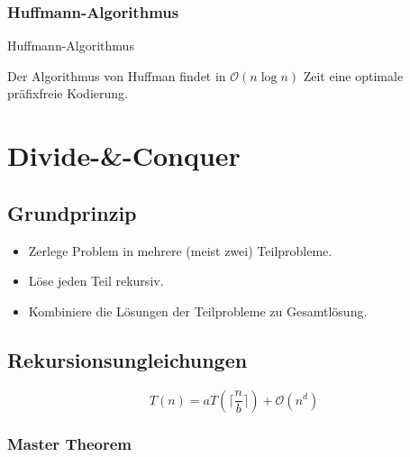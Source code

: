 \documentclass{scrartcl}
\begin{document}
\subsubsection{Huffmann-Algorithmus}

\begin{algorithm}[H]
	\caption{Huffmann-Algorithmus}
\end{algorithm}

Der Algorithmus von Huffman findet in $ \mathcal{O}(n \log n) $ Zeit eine optimale präfixfreie Kodierung.

\section{Divide-\&-Conquer}

\subsection{Grundprinzip}

\begin{itemize}
	\item Zerlege Problem in mehrere (meist zwei) Teilprobleme.
	\item Löse jeden Teil rekursiv.
	\item Kombiniere die Lösungen der Teilprobleme zu Gesamtlösung.
\end{itemize}

\subsection{Rekursionsungleichungen}

\[ T(n) = aT(\lceil \frac{n}{b} \rceil) + \mathcal{O}(n^d) \]

\subsubsection{Master Theorem}
\end{document}
